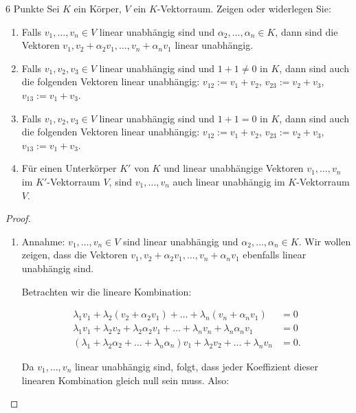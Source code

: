\documentclass{../problemset}
\begin{document}
\begin{problem}{6 Punkte}
Sei $K$ ein Körper, $V$ ein $K$-Vektorraum. Zeigen oder widerlegen Sie:
\begin{enumerate}
	\item Falls $v_1, \ldots, v_n \in V$ linear unabhängig sind und $\alpha_2, \ldots, \alpha_n \in K$, dann sind die Vektoren $v_1, v_2 + \alpha_2v_1, \ldots, v_n + \alpha_nv_1$ linear unabhängig.
	\item Falls $v_1, v_2, v_3 \in V$ linear unabhängig sind und $1 + 1 \neq 0$ in $K$, dann sind auch die folgenden Vektoren linear unabhängig: $v_{12} := v_1 + v_2$, $v_{23} := v_2 + v_3$, $v_{13} := v_1 + v_3$.
	\item Falls $v_1, v_2, v_3 \in V$ linear unabhängig sind und $1 + 1 = 0$ in $K$, dann sind auch die folgenden Vektoren linear unabhängig: $v_{12} := v_1 + v_2$, $v_{23} := v_2 + v_3$, $v_{13} := v_1 + v_3$.
	\item Für einen Unterkörper $K'$ von $K$ und linear unabhängige Vektoren $v_1, \ldots, v_n$ im $K'$-Vektorraum $V$, sind $v_1, \ldots, v_n$ auch linear unabhängig im $K$-Vektorraum $V$.
\end{enumerate}
\begin{proof}
	$ $

	\begin{enumerate}
		\item Annahme: $v_1, \ldots, v_n \in V$ sind linear unabhängig und $\alpha_2, \ldots, \alpha_n \in K$.
		      Wir wollen zeigen, dass die Vektoren $v_1, v_2 + \alpha_2v_1, \ldots, v_n + \alpha_nv_1$ ebenfalls linear unabhängig sind.

		      Betrachten wir die lineare Kombination:

		      \begin{align*}
			      \lambda_1 v_1 + \lambda_2 (v_2 + \alpha_2 v_1) + \ldots + \lambda_n (v_n + \alpha_n v_1)               & = 0  \\
			      \lambda_1 v_1 + \lambda_2v_2 + \lambda_2\alpha_2v_1 + \ldots + \lambda_nv_n + \lambda_n\alpha_nv_1     & = 0  \\
			      (\lambda_1 + \lambda_2\alpha_2 + \ldots + \lambda_n\alpha_n)v_1 + \lambda_2v_2 + \ldots + \lambda_nv_n & = 0.
		      \end{align*}

		      Da $v_1, \ldots, v_n$ linear unabhängig sind, folgt, dass jeder Koeffizient dieser linearen Kombination gleich null sein muss.
		      Also:


\end{enumerate}
\end{proof}
\end{problem}
\end{document}
